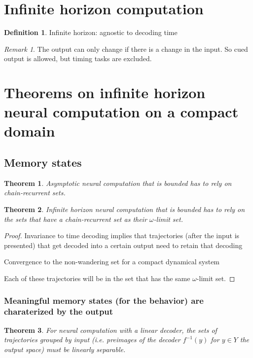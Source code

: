 \documentclass{scrartcl}
\newtheorem{theorem}{Theorem}
\theoremstyle{definition}
\newtheorem{definition}{Definition}
\theoremstyle{remark}
\newtheorem{remark}{Remark}
\begin{document}
\section{Infinite horizon computation}	
\begin{definition}
Infinite horizon: agnostic to decoding time
\end{definition}

\begin{remark}
The output can only change if there is a change in the input. 
So cued output is allowed, but timing tasks are excluded.
\end{remark}

\section{Theorems on infinite horizon neural computation on a compact domain}


\subsection{Memory states}%

\begin{theorem}
Asymptotic neural computation that is bounded has to rely on chain-recurrent sets.
\end{theorem}

\begin{theorem}	
Infinite horizon neural computation that is bounded has to rely on the sets that have a chain-recurrent set as their $\omega$-limit set.
\end{theorem}	



\begin{proof}
Invariance to time decoding implies that trajectories (after the input is presented) that get decoded into a certain output need to retain that decoding

Convergence to the non-wandering set for a compact dynamical system \citep{conley1978}

Each of these trajectories will be in the set that has the same $\omega$-limit set.
\end{proof}


\subsubsection{Meaningful memory states (for the behavior) are charaterized by the output}
\begin{theorem}
For neural computation with a linear decoder, the sets of trajectories grouped by input (i.e. preimages of the decoder $f^{-1}(y)$ for $y\in Y$ the output space) must be linearly separable.
\end{theorem}
\end{document}
